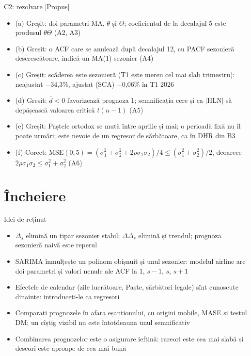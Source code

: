 \ifsolutions
\begin{frame}{C2: rezolvare [Propus]}
\itemsize{\scriptsize}
\begin{itemize}
    \item (a) Greșit: doi parametri MA, $\theta$ și $\Theta$; coeficientul de la decalajul 5 este produsul $\theta\Theta$ (A2, A3)
    \item (b) Greșit: o ACF care se anulează după decalajul 12, cu PACF sezonieră descrescătoare, indică un MA(1) sezonier (A4)
    \item (c) Greșit: scăderea este sezonieră (T1 este mereu cel mai slab trimestru): neajustat $-$34{,}3\%, ajustat (SCA) $-$0{,}06\% în T1 2026
    \item (d) Greșit: $\bar d < 0$ favorizează prognoza 1; semnificația cere și ca $|\mathrm{HLN}|$ să depășească valoarea critică $t(n - 1)$ (A5)
    \item (e) Greșit: Paștele ortodox se mută între aprilie și mai; o perioadă fixă nu îl poate urmări; este nevoie de un regresor de sărbătoare, ca în DHR din B3
    \item (f) Corect: $\mathrm{MSE}(0{,}5) = (\sigma_1^2 + \sigma_2^2 + 2\rho\sigma_1\sigma_2)/4 \le (\sigma_1^2 + \sigma_2^2)/2$, deoarece $2\rho\sigma_1\sigma_2 \le \sigma_1^2 + \sigma_2^2$ (A6)
\end{itemize}
\end{frame}
\fi


\section{Încheiere}

\begin{frame}{Idei de reținut}
\itemsize{\small}
\begin{itemize}
    \item $\Delta_s$ elimină un tipar sezonier stabil; $\Delta\Delta_s$ elimină și trendul; prognoza sezonieră naivă este reperul
    \item SARIMA înmulțește un polinom obișnuit și unul sezonier: modelul airline are doi parametri și valori nenule ale ACF la $1$, $s - 1$, $s$, $s + 1$
    \item Efectele de calendar (zile lucrătoare, Paște, sărbători legale) sînt cunoscute dinainte: introduceți-le ca regresori
    \item Comparați prognozele în afara eșantionului, cu origini mobile, MASE și testul DM; un cîștig vizibil nu este întotdeauna unul semnificativ
    \item Combinarea prognozelor este o asigurare ieftină: rareori este cea mai slabă și deseori este aproape de cea mai bună
\end{itemize}
\end{frame}

